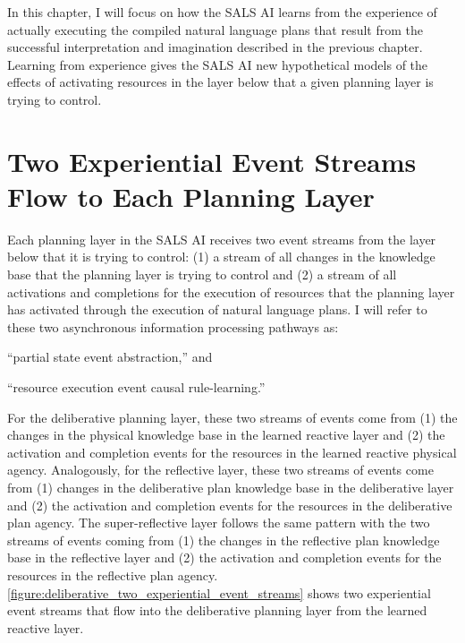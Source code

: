 In this chapter, I will focus on how the SALS AI learns from the
experience of actually executing the compiled natural language plans
that result from the successful interpretation and imagination
described in the previous chapter.  Learning from experience gives the
SALS AI new hypothetical models of the effects of activating resources
in the layer below that a given planning layer is trying to control.

\section{Two Experiential Event Streams Flow to Each Planning Layer}
\label{section:two_experiential_event_streams_flow_to_each_planning_layer}

Each planning layer in the SALS AI receives two event streams from the
layer below that it is trying to control: (1) a stream of all changes
in the knowledge base that the planning layer is trying to control and
(2) a stream of all activations and completions for the execution of
resources that the planning layer has activated through the execution
of natural language plans.  I will refer to these two asynchronous
information processing pathways as:
\begin{packed_enumerate}
\item{``partial state event abstraction,'' and}
\item{``resource execution event causal rule-learning.''}
\end{packed_enumerate}
For the deliberative planning layer, these two streams of events come
from (1) the changes in the physical knowledge base in the learned
reactive layer and (2) the activation and completion events for the
resources in the learned reactive physical agency.  Analogously, for
the reflective layer, these two streams of events come from (1)
changes in the deliberative plan knowledge base in the deliberative
layer and (2) the activation and completion events for the resources
in the deliberative plan agency.  The super-reflective layer follows
the same pattern with the two streams of events coming from (1) the
changes in the reflective plan knowledge base in the reflective layer
and (2) the activation and completion events for the resources in the
reflective plan agency.
{\mbox{\autoref{figure:deliberative_two_experiential_event_streams}}}
shows two experiential event streams that flow into the deliberative
planning layer from the learned reactive layer.
